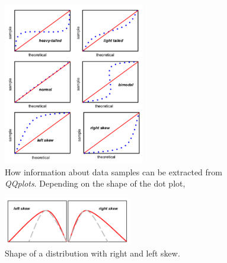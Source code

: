 \begin{figure}[ht!]
	\centering
	\includegraphics[width=0.55\textwidth]{figures/ch2/qqplot-tutorial}
	\caption{How information about data samples can be extracted from \textit{QQplots}. Depending on the shape of the dot plot,  }
	\label{fig:qqplot-tutorial-ap}
\end{figure}

\begin{figure}[ht!]
	\centering
	\includegraphics[width=0.5\textwidth]{figures/apA/rl-skew}
	\caption{Shape of a distribution with right and left skew.}
	\label{fig:qqplot-rl-skew}
\end{figure}

